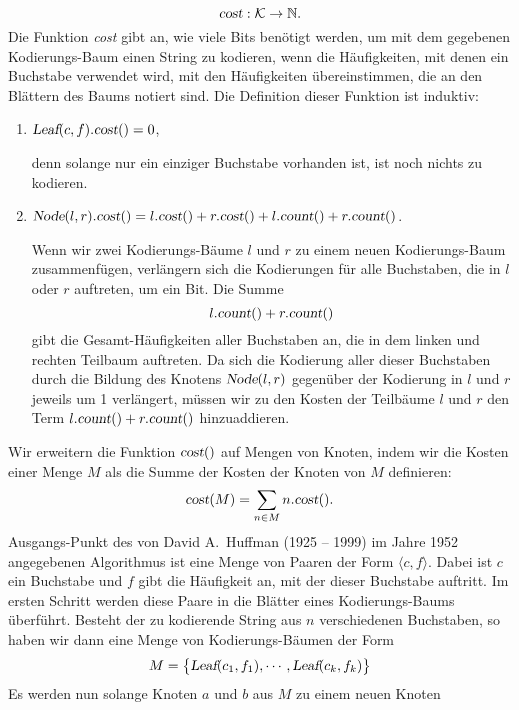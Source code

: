 \[ \textsl{cost}: \mathcal{K} \rightarrow {\mathbb N}. \]
Die Funktion \textsl{cost} gibt an, wie viele Bits ben\"otigt werden, um mit dem gegebenen
Kodierungs-Baum einen String zu kodieren, wenn die H\"aufigkeiten, mit denen ein Buchstabe
verwendet wird, mit den H\"aufigkeiten \"ubereinstimmen, die an den Bl\"attern des Baums notiert
sind.  Die Definition dieser Funktion ist induktiv:
\begin{enumerate}
\item $\textsl{Leaf}(c,f).\textsl{cost}() = 0$,

      denn solange nur ein einziger Buchstabe vorhanden ist, ist noch nichts zu kodieren.
\item $\textsl{Node}(l,r).\textsl{cost}() = 
       l.\textsl{cost}() + r.\textsl{cost}() + l.\textsl{count}() + r.\textsl{count}()$.

      Wenn wir zwei Kodierungs-B\"aume $l$ und $r$ zu einem neuen Kodierungs-Baum
      zusammenf\"ugen, verl\"angern sich die Kodierungen f\"ur alle Buchstaben, die in $l$ oder
      $r$ auftreten, um ein Bit.
      Die Summe 
      \[ l.\textsl{count}() + r.\textsl{count}() \]
      gibt die Gesamt-H\"aufigkeiten aller Buchstaben an, die in dem linken und
      rechten Teilbaum auftreten.  Da sich die Kodierung aller dieser Buchstaben
      durch die Bildung des Knotens $\textsl{Node}(l,r)$ gegen\"uber der Kodierung in $l$
      und $r$ jeweils um 1 verl\"angert, m\"ussen wir zu den Kosten der Teilb\"aume $l$ und $r$
      den Term $l.\textsl{count}() + r.\textsl{count}()$ hinzuaddieren.
\end{enumerate}
Wir erweitern die Funktion $\textsl{cost}()$ auf Mengen von Knoten, indem wir die Kosten
einer Menge $M$ als die Summe der Kosten der Knoten von $M$ definieren:
\[ \textsl{cost}(M) = \sum\limits_{n\in M} n.\textsl{cost}(). \]
Ausgangs-Punkt des von David A.~Huffman (1925 -- 1999) im Jahre 1952 angegebenen
Algorithmus \cite{huffman:52} ist eine Menge von Paaren der Form $\langle c, f\rangle$.  Dabei ist
$c$ ein 
Buchstabe und $f$ gibt die H\"aufigkeit an, mit der dieser Buchstabe auftritt.  Im ersten
Schritt werden diese Paare in die Bl\"atter eines Kodierungs-Baums \"uberf\"uhrt.  Besteht der
zu kodierende String aus  $n$ verschiedenen Buchstaben, so haben
wir dann eine Menge von Kodierungs-B\"aumen der Form
\begin{equation}
  \label{eq:huffmann1}
 M = \bigl\{  \textsl{Leaf}(c_1, f_1), \cdots, \textsl{Leaf}(c_k, f_k) \bigr\}   
\end{equation}
Es werden nun solange Knoten $a$ und $b$ aus $M$ zu einem neuen Knoten
